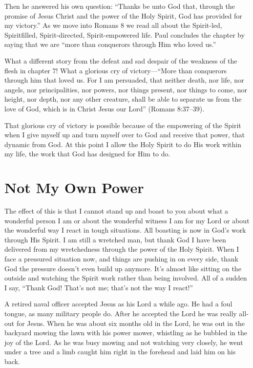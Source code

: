 Then he answered his own question: “Thanks be unto
God that, through the promise of Jesus Christ and the power
of the Holy Spirit, God has provided for my victory.” As we
move into Romans 8 we read all about the Spirit-led, Spiritfilled,
Spirit-directed, Spirit-empowered life. Paul concludes
the chapter by saying that we are “more than conquerors
through Him who loved us.”

What a different story from the defeat and sad despair
of the weakness of the flesh in chapter 7! What a glorious
cry of victory—“More than conquerors through him that
loved us. For I am persuaded, that neither death, nor life,
nor angels, nor principalities, nor powers, nor things present,
nor things to come, nor height, nor depth, nor any other
creature, shall be able to separate us from the love of God,
which is in Christ Jesus our Lord” (Romans 8:37–39).

That glorious cry of victory is possible because of the
empowering of the Spirit when I give myself up and turn
myself over to God and receive that power, that dynamic
from God. At this point I allow the Holy Spirit to do His
work within my life, the work that God has designed for
Him to do.


\section*{Not My Own Power}

The effect of this is that I cannot stand up and boast
to you about what a wonderful person I am or about the
wonderful witness I am for my Lord or about the wonderful
way I react in tough situations. All boasting is now in
God’s work through His Spirit. I am still a wretched man,
but thank God I have been delivered from my wretchedness
through the power of the Holy Spirit. When I face a
pressured situation now, and things are pushing in on every
side, thank God the pressure doesn’t even build up anymore.
It’s almost like sitting on the outside and watching
the Spirit work rather than being involved. All of a sudden I
say, “Thank God! That’s not me; that’s not the way I react!”

A retired naval officer accepted Jesus as his Lord a while
ago. He had a foul tongue, as many military people do.
After he accepted the Lord he was really all-out for Jesus.
When he was about six months old in the Lord, he was out
in the backyard mowing the lawn with his power mower,
whistling as he bubbled in the joy of the Lord. As he was
busy mowing and not watching very closely, he went under
a tree and a limb caught him right in the forehead and laid
him on his back.

